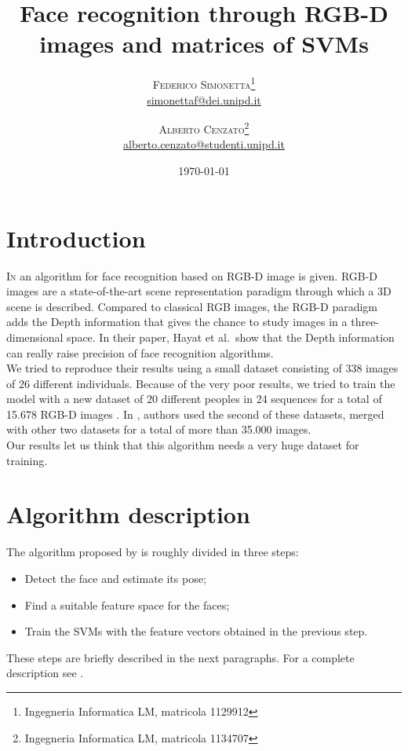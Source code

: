\documentclass{article}
\title{Face recognition through RGB-D images and matrices of SVMs} %
\author{%
	\textsc{Federico Simonetta}\thanks{Ingegneria Informatica LM, matricola 1129912} \\[1ex] %
	\normalsize \href{mailto:simonettaf@dei.unipd.it}{simonettaf@dei.unipd.it} %
	\and %
	\textsc{Alberto Cenzato}\thanks{Ingegneria Informatica LM, matricola 1134707} \\[1ex] %
	\normalsize \href{mailto:alberto.cenzato@studenti.unipd.it}{alberto.cenzato@studenti.unipd.it} %
}
\date{\today} %
\begin{document}
\Huge
\bfseries
\maketitle
\mdseries
\normalsize

\section{Introduction}\label{sec:intro}
\lettrine[nindent=0em,lines=2]{I}n \citet{Hayat2016} an algorithm for face recognition based on RGB-D image is given. RGB-D images are a state-of-the-art scene representation paradigm through which a 3D scene is described. Compared to classical RGB images, the RGB-D paradigm adds the Depth information that gives the chance to study images in a three-dimensional space. In their paper, Hayat et al.\ show that the Depth information can really raise precision of face recognition algorithms. \\
We tried to reproduce their results using a small dataset consisting of 338 images of 26 different individuals. Because of the very poor results, we tried to train the model with a new dataset of 20 different peoples in 24 sequences for a total of 15.678 RGB-D images \citep{Fanelli2013}. In \citet{Hayat2016}, authors used the second of these datasets, merged with other two datasets for a total of more than 35.000 images. \\
Our results let us think that this algorithm needs a very huge dataset for training.

\section{Algorithm description}\label{sec:algorithm_desc}
The algorithm proposed by \citet{Hayat2016} is roughly divided in three steps:
\begin{itemize}
	\item Detect the face and estimate its pose;
	\item Find a suitable feature space for the faces;
	\item Train the SVMs with the feature vectors obtained in the previous step.
\end{itemize}
These steps are briefly described in the next paragraphs. For a complete description see \citet{Hayat2016}.
\end{document}
